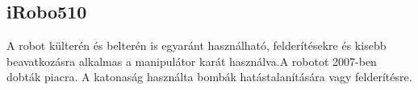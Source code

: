 \renewcommand{\xname}{iRobo510}
\renewcommand{\x}{0.521}
\renewcommand{\y}{0.686}
\renewcommand{\z}{0.178}
\renewcommand{\weight}{20}
\renewcommand{\img}{MobilisRobotok/iRobo/iRobo510.jpg}
\renewcommand{\sources}{Forrás: https://www.army-technology.com}
\renewcommand{\captionn}{iRobo 510 lánctalpas packboot}
\renewcommand{\watherProf}{Igen -3m ig.}
\renewcommand{\sebesseg}{9.3}
\renewcommand{\weight}{10.89}
\renewcommand{\AcAndGy}{Igen}
\renewcommand{\GPS}{Igen}
\subsection*{iRobo510}
 A robot külterén és belterén is egyaránt használható, felderítésekre és kisebb beavatkozásra alkalmas a manipulátor karát használva.A robotot 2007-ben dobták piacra. A katonaság használta bombák hatástalanítására vagy felderítésre. 

\renewcommand{\aspectratioPic}{0.5}



